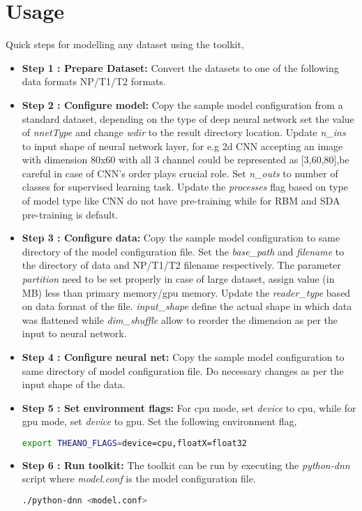 \section{Usage}
Quick steps for modelling any dataset using the toolkit,
\begin{itemize}
	\item{\textbf{Step 1 : Prepare Dataset:} Convert the datasets to one of the following data formats NP/T1/T2 formats. }
	\item{\textbf{Step 2 : Configure model:} Copy the sample model configuration from a standard dataset, depending on the type of deep neural network set the value of \textit{nnetType} and change \textit{wdir} to the result directory location.  Update \textit{n\_ins} to input shape of neural network layer, for e.g 2d CNN accepting an image with dimension 80x60 with all 3 channel could be represented as [3,60,80],be careful in case of CNN's order plays crucial role.  Set \textit{n\_outs} to number of classes for supervised learning task.  Update the \textit{processes} flag based on type of model type like CNN do not have pre-training while for RBM and SDA pre-training is default.}
	\item {\textbf{Step 3 : Configure data:} Copy the sample model configuration to same directory of the model configuration file.  Set the \textit{base\_path} and \textit{filename} to the directory of data and NP/T1/T2 filename respectively.  The parameter \textit{partition} need to be set properly in case of large dataset, assign value (in MB) less than primary memory/gpu memory.  Update the \textit{reader\_type} based on data format of the file.  \textit{input\_shape} define the actual shape in which data was flattened while \textit{dim\_shuffle} allow to reorder the dimension as per the input to neural network.}
	\item{\textbf{Step 4 : Configure neural net:} Copy the sample model configuration to same directory of model configuration file. Do necessary changes as per the input shape of the data.}	
	\item{\textbf{Step 5 : Set environment flags:} For cpu mode, set \textit{device} to cpu, while for gpu mode, set \textit{device} to gpu. Set the following environment flag,
	\begin{lstlisting}[language=bash,basicstyle=\small] 
		export THEANO_FLAGS=device=cpu,floatX=float32
	\end{lstlisting}} 
	
	\item{\textbf{Step 6 : Run toolkit:} The toolkit can be run by executing the \textit{python-dnn} script where \textit{model.conf} is the model configuration file.
	\begin{lstlisting}[language=bash,basicstyle=\small] 
		./python-dnn <model.conf>
	\end{lstlisting}	} 
\end{itemize}

